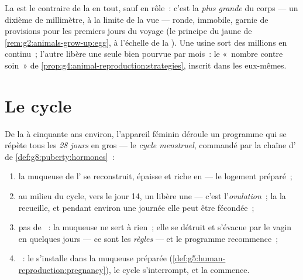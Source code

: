 \begin{example}\label{ex:g8:reproductive-systems:egg}
La  est le contraire de la  en tout, sauf en
rôle~: c'est la \emph{plus grande}  du corps --- un dixième
de millimètre, à la limite de la vue --- ronde, immobile, garnie de
provisions pour les premiers jours du voyage (le principe du jaune
de \cref{rem:g2:animals-grow-up:egg}, à l'échelle de la ).
Une usine sort des millions en continu~; l'autre libère une seule
 bien pourvue par mois~: le «~nombre contre soin~» de
\cref{prop:g4:animal-reproduction:strategies}, inscrit dans les
 eux-mêmes.
\end{example}

\section{Le cycle}

\begin{proposition}\label{prop:g8:reproductive-systems:cycle}
De la  à cinquante ans environ, l'appareil féminin déroule un
programme qui se répète tous les \emph{28 jours} en gros --- le
\emph{cycle menstruel}, commandé par la
chaîne d' de \cref{def:g8:puberty:hormones}~:
\begin{enumerate}
  \item la muqueuse de l' se reconstruit, épaisse et riche en
         --- le logement préparé~;
  \item au milieu du cycle, vers le jour 14, un  libère une
         --- c'est l'\emph{ovulation}~;
        la  la recueille, et pendant environ une journée elle
        peut être fécondée~;
  \item pas de ~: la muqueuse ne sert à rien~; elle se
        détruit et s'évacue par le vagin en quelques jours --- ce
        sont les \emph{règles} --- et le programme
        recommence~;
  \item {}~: le  s'installe dans la muqueuse
        préparée
        (\cref{def:g5:human-reproduction:pregnancy}), le cycle
        s'interrompt, et la  commence.
\end{enumerate}
\end{proposition}
\admitted


